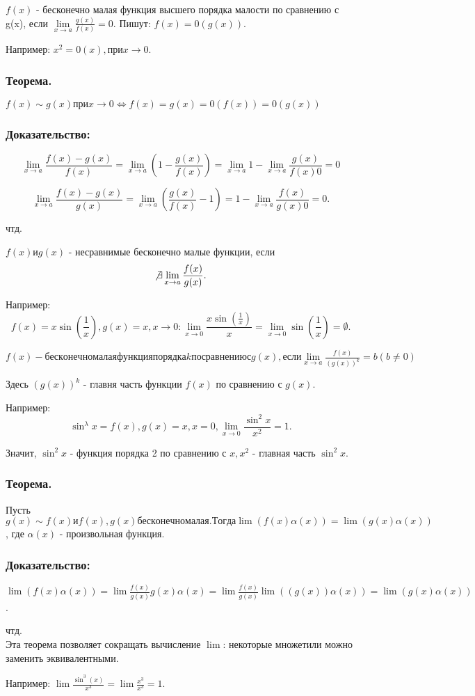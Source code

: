 	$f(x)$ - бесконечно малая функция высшего порядка малости по сравнению с g(x), если $\lim\limits_{x \rightarrow a}\frac{g(x)}{f(x)}=0$. Пишут: $f(x) = 0(g(x))$.

	Например: $x^2 = 0(x), при x \rightarrow 0$.

	\subsubsection {Теорема.}
	$f(x) \sim g(x) при x \rightarrow 0 \Leftrightarrow f(x) = g(x) = 0(f(x)) = 0(g(x))$

	\subsubsection {Доказательство:}

	$$\lim\limits_{x \rightarrow a}\frac{f(x) - g(x)}{f(x)} = \lim\limits_{x \rightarrow a}\left(1 - \frac{g(x)}{f(x)}\right) =
	 \lim\limits_{x \rightarrow a}1 - \lim\limits_{x \rightarrow a}\frac{g(x)}{f(x)0}=0$$

	$$\lim\limits_{x \rightarrow a}\frac{f(x) - g(x)}{g(x)} = \lim\limits_{x \rightarrow a}\left(\frac{g(x)}{f(x)} - 1\right) =
	 1 - \lim\limits_{x \rightarrow a}\frac{f(x)}{g(x)0}=0.$$

	чтд.

	$f(x) и g(x)$ - несравнимые бесконечно малые функции, если $$\not\exists \lim\limits_{x \rightarrow a}\frac{f(x)}{g(x)}.$$

	Например: $$f(x) = x\sin(\frac{1}{x}), g(x)=x, x\rightarrow 0: \lim\limits_{x \rightarrow 0}\frac{x\sin(\frac{1}{x})}x =
	 \lim\limits_{x \rightarrow 0}\sin(\frac{1}{x}) = \emptyset.$$

	$f(x) - бесконечно малая функция порядка k по сравнению с g(x), если \lim\limits_{x\rightarrow a}\frac{f(x)}{(g(x))^k}=b (b \neq 0)$

	Здесь $(g(x))^k$ - главня часть функции $f(x)$ по сравнению с $g(x)$.

	Например: $$\sin^{\lambda}x=f(x), g(x)=x, x=0, \lim\limits_{x \rightarrow 0}\frac{\sin^{2}x}{x^2}=1.$$

	Значит, $\sin^{2}x$ - функция порядка 2 по сравнению с $x, x^2$ - главная часть $\sin^{2}x$.

	\subsubsection {Теорема.}

	Пусть $g(x) \sim f(x) и f(x), g(x) бесконечно малая. Тогда \lim(f(x)\alpha(x))=\lim(g(x)\alpha(x))$, где $\alpha(x)$ - произвольная функция.

	\subsubsection {Доказательство:}

	$\lim(f(x)\alpha(x)) = \lim\frac{f(x)}{g(x)}g(x)\alpha(x) = \lim\frac{f(x)}{g(x)} \lim((g(x)) \alpha(x)) = \lim(g(x)\alpha(x))$.

	чтд.
\\
	Эта теорема позволяет сокращать вычисление $\lim$: некоторые множетили можно заменить эквивалентными.

	Например: $\lim\frac{\sin^{3}(x)}{x^3}=\lim\frac{x^3}{x^3}=1$.
